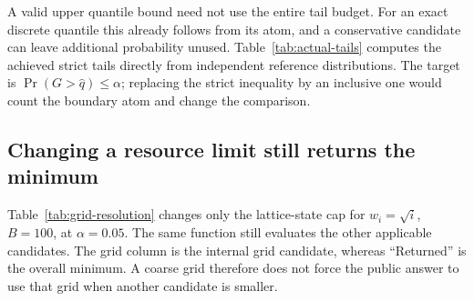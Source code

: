 \documentclass[11pt,letterpaper]{article}
\numberwithin{equation}{section}
\theoremstyle{definition}
\theoremstyle{remark}
\begin{document}
\begin{table}[htbp]
\centering
\small

\caption{Individual concentration candidates at $\alpha=0.05$. These are
component bounds, not the public function's final output. A missing
$K$-functional row can mean the decomposition adds no improvement over its
unsplit comparison. The returned minimum also includes the numerical
candidates in Table~\ref{tab:family-comparison}.}
\label{tab:concentration-components}
\end{table}

A valid upper quantile bound need not use the entire tail budget. For an
exact discrete quantile this already follows from its atom, and a
conservative candidate can leave additional probability unused.
Table~\ref{tab:actual-tails} computes the achieved strict tails directly
from independent reference distributions. The target is
$\Pr(G>\widehat q)\le\alpha$; replacing the strict inequality by an
inclusive one would count the boundary atom and change the comparison.

\begin{table}[htbp]
\centering
\footnotesize
\setlength{\tabcolsep}{3.3pt}

\caption{Returned quantiles and achieved strict-tail ratios from independent
finite-law references. A ratio below one measures unused tail budget;
it is not an error in the exact quantile convention.}
\label{tab:actual-tails}
\end{table}

\subsection{Changing a resource limit still returns the minimum}

Table~\ref{tab:grid-resolution} changes only the lattice-state cap for
$w_i=\sqrt{i}$, $B=100$, at $\alpha=0.05$. The same function still evaluates
the other applicable candidates. The grid column is the internal grid
candidate, whereas ``Returned'' is the overall minimum. A coarse grid
therefore does not force the public answer to use that grid when another
candidate is smaller.

\begin{table}[htbp]
\centering
\small

\caption{Grid state-budget study with the dynamic-programming work cap
fixed at its default $2\times10^7$. The grid allowance is its deterministic
absolute quantile-error bound plus numerical allowance. No method selector
is used in any row.}
\label{tab:grid-resolution}
\end{table}
\end{document}
